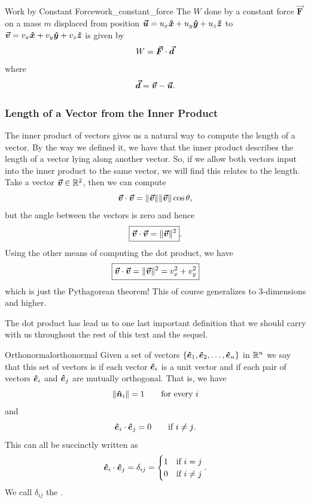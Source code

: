         \begin{ex}{Work by Constant Force}{work_constant_force}
        The  $W$ done by a constant force $\boldsymbol{\vec{F}}$ on a mass $m$ displaced from position $\boldsymbol{\boldsymbol{\vec{u}}}=u_x \boldsymbol{\hat{x}} + u_y \boldsymbol{\hat{y}} + u_z\boldsymbol{\hat{z}} $ to $\boldsymbol{\boldsymbol{\vec{v}}} = v_x \boldsymbol{\hat{x}} + v_y \boldsymbol{\hat{y}} + v_z \boldsymbol{\hat{z}}$ is given by
        \[
        W=\boldsymbol{\vec{F}}\cdot \boldsymbol{\vec{d}}
        \]
        where
        \[
        \boldsymbol{\vec{d}}=\boldsymbol{\boldsymbol{\vec{v}}}-\boldsymbol{\boldsymbol{\vec{u}}}.
        \]
        \end{ex}
        
        \subsubsection{Length of a Vector from the Inner Product}
        The inner product of vectors gives us a natural way to compute the length of a vector.  By the way we defined it, we have that the inner product describes the length of a vector lying along another vector.  So, if we allow both vectors input into the inner product to the same vector, we will find this relates to the length. Take a vector $\boldsymbol{\boldsymbol{\vec{v}}} \in \mathbb{R}^2$, then we can compute
        \[
        \boldsymbol{\boldsymbol{\vec{v}}} \cdot \boldsymbol{\boldsymbol{\vec{v}}} = \|\boldsymbol{\boldsymbol{\vec{v}}}\|\|\boldsymbol{\boldsymbol{\vec{v}}}\| \cos \theta,
        \]
        but the angle between the vectors is zero and hence
        \[
        \boxed{\boldsymbol{\boldsymbol{\vec{v}}}\cdot \boldsymbol{\boldsymbol{\vec{v}}} = \|\boldsymbol{\boldsymbol{\vec{v}}}\|^2}.
        \]
        Using the other means of computing the dot product, we have
        \[
        \boxed{\boldsymbol{\boldsymbol{\vec{v}}} \cdot \boldsymbol{\boldsymbol{\vec{v}}} = \|\boldsymbol{\boldsymbol{\vec{v}}}\|^2 = v_x^2 + v_y^2}
        \]
        which is just the Pythagorean theorem!  This of course generalizes to 3-dimensions and higher.
        
        The dot product has lead us to one last important definition that we should carry with us throughout the rest of this text and the sequel.  
        
        \begin{df}{Orthonormal}{orthonormal}
            Given a set of vectors $\{\boldsymbol{\hat{e}}_1,\boldsymbol{\hat{e}}_2,\dots,\boldsymbol{\hat{e}}_n\}$ in $\mathbb{R}^n$ we say that this set of vectors is  if each vector $\boldsymbol{\hat{e}}_i$ is a unit vector and if each pair of vectors $\boldsymbol{\hat{e}}_i$ and $\boldsymbol{\hat{e}}_j$ are mutually orthogonal. That is, we have
            \[
            \|\boldsymbol{\hat{n}}_i\|=1 \qquad \textrm{for every $i$}
            \]
            and
            \[
            \boldsymbol{\hat{e}}_i \cdot \boldsymbol{\hat{e}}_j = 0 \qquad \textrm{if $i\neq j$}.
            \]
            This can all be succinctly written as
            \[
            \boldsymbol{\hat{e}}_i \cdot \boldsymbol{\hat{e}}_j = \delta_{ij} = \begin{cases} 1 & \textrm{if $i=j$}\\ 0 & \textrm{if $i\neq j$}\end{cases}.
            \]
            We call $\delta_{ij}$ the .
        \end{df}
        
